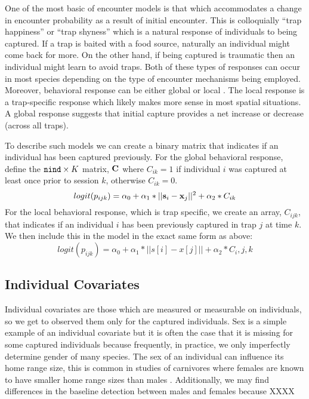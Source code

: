 One of the most basic of encounter models is that which accommodates a
change in encounter probability as a result of initial encounter.
This is colloquially ``trap happiness'' or ``trap shyness'' which is a
natural response of individuals to being captured. If a trap is baited
with a food source, naturally an individual might come back for
more. On the other hand, if being captured is traumatic then an
individual might learn to avoid traps. Both of these types of
responses can occur in most species depending on the type of encounter
mechanisms being employed. Moreover, behavioral response can be either
global \citep{gardner_etal:2010} or local \citep{royle_etal:2009jwm}.
The local response is a trap-specific response which likely makes more
sense in most spatial situations. A global response suggests that
initial capture provides a net increase or decrease (across all
traps).

To describe such models we can create a binary matrix that indicates
if an individual has been captured previously.  For the global
behavioral response, define the $\mbox{\tt nind} \times K$ matrix,
${\bf C}$ where $C_{ik} =1$
if individual $i$ was captured at least once prior to session
$k$, otherwise $C_{ik} = 0$.
\[
logit(p_{ijk}) = \alpha_{0} + \alpha_1 *||{\bf s}_{i}-{\bf x}_{j}||^{2} + \alpha_2*C_{ik}
\]
For the local behavioral response, which is trap specific, we create
an array, $C_{ijk}$, that indicates if an individual $i$ has been
previously captured in trap $j$ at time $k$.  We then include this in
the model in the exact same form as above:
\[
logit(p_{ijk}) = \alpha_{0} + \alpha_1*||s[i]-x[j]|| + \alpha_2*C_i,j,k	
\]


\subsection{Individual Covariates}

Individual covariates are those which are measured or measurable on
individuals, so we get to observed them only for the captured
individuals. Sex is a simple example of an individual covariate but it is often the
case that it is missing for some captured individuals because 
frequently, in practice, we only imperfectly determine gender of many
species.  The sex of an individual can influence its home range size, this is
common in studies of carnivores where females are known to have smaller home range sizes than
males \citep{gardner_etal:2010jwm, sollmann_etal:2011}.  Additionally, we may find differences in
the baseline detection between males and females because XXXX 


